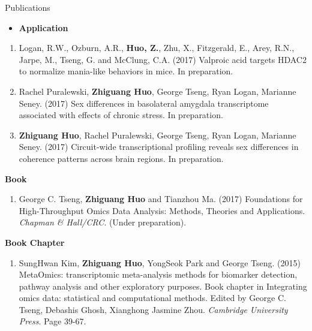 \documentclass{resume} %
\begin{document}
\begin{rSection}{Publications}
\begin{itemize}
\item \textbf{Application}
\end{itemize}

\begin{enumerate}[noitemsep,topsep=0pt,resume]
\item Logan, R.W., Ozburn, A.R., {\bf Huo, Z.}, Zhu, X., Fitzgerald, E., Arey, R.N., Jarpe, M., Tseng, G. and McClung, C.A. (2017)
Valproic acid targets HDAC2 to normalize mania-like behaviors in mice. In preparation.

\item Rachel Puralewski, {\bf Zhiguang Huo}, George Tseng, Ryan Logan, Marianne Seney. (2017) Sex differences in basolateral amygdala transcriptome associated with effects of chronic stress. In preparation.

\item {\bf Zhiguang Huo}, Rachel Puralewski, George Tseng, Ryan Logan, Marianne Seney. (2017) Circuit-wide transcriptional profiling reveals sex differences in coherence patterns across brain regions. In preparation.

\end{enumerate}




\textbf{Book}
\begin{enumerate}[noitemsep,topsep=0pt,resume]
\item  George C. Tseng, {\bf Zhiguang Huo} and Tianzhou Ma. (2017)
Foundations for High-Throughput Omics Data Analysis: Methods, Theories and Applications. \emph{Chapman \& Hall/CRC}. 
(Under preparation).
\end{enumerate}

\textbf{Book Chapter}
\begin{enumerate}[noitemsep,topsep=0pt,resume]
\item SungHwan Kim,  {\bf Zhiguang Huo}, YongSeok Park and George Tseng.  (2015) MetaOmics: transcriptomic meta-analysis methods for biomarker detection, pathway analysis and other exploratory purposes. Book chapter in Integrating omics data: statistical and computational methods. Edited by George C. Tseng, Debashis Ghosh, Xianghong Jasmine Zhou. \emph{Cambridge University Press}. Page 39-67.

\end{enumerate}
\end{rSection}
\end{document}
